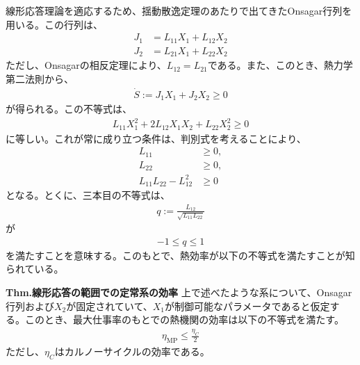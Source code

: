 \documentclass[a4paper,11pt]{jsarticle}
\numberwithin{equation}{section}
\begin{document}
線形応答理論を適応するため、揺動散逸定理のあたりで出てきたOnsagar行列を用いる。この行列は、
\begin{align}
    J_1 &= L_{11} X_1 + L_{12} X_2\\
    J_2 &= L_{21} X_1 + L_{22} X_2
\end{align}
ただし、Onsagarの相反定理により、$L_{12} = L_{21}$である。また、このとき、熱力学第二法則から、
\begin{align}
    \dot{S} := J_1 X_1 + J_2 X_2 \geq 0
\end{align}
が得られる。この不等式は、
\begin{align}
  L_{11} X_1^2 + 2L_{12} X_1 X_2 + L_{22} X_2^2 \geq 0
\end{align}
に等しい。これが常に成り立つ条件は、判別式を考えることにより、
\begin{align}
    L_{11} &\geq 0,  \\
    L_{22} &\geq 0,  \\
    L_{11}L_{22} - L_{12}^2 &\geq 0
\end{align}
となる。とくに、三本目の不等式は、
\begin{align}
    q := \frac{L_{12}}{\sqrt{L_{11}L_{22}}}
\end{align}
が
\begin{align}
  -1 \leq q \leq 1
\end{align}
を満たすことを意味する。このもとで、熱効率が以下の不等式を満たすことが知られている。

\begin{itembox}[l]{\textbf{Thm.線形応答の範囲での定常系の効率}}
  上で述べたような系について、Onsagar行列および$X_2$が固定されていて、$X_1$が制御可能なパラメータであると仮定する。このとき、最大仕事率のもとでの熱機関の効率は以下の不等式を満たす。
  \begin{align}
    \eta_{\text{MP}} \leq \frac{\eta_C}{2} 
  \end{align}
  ただし、$\eta_C$はカルノーサイクルの効率である。
\end{itembox}
\end{document}

